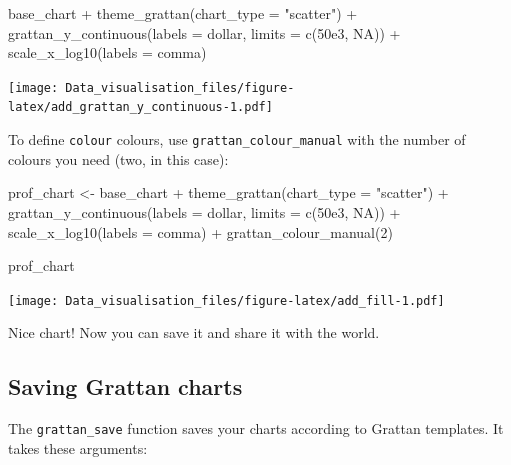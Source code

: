 \documentclass[
]{book}
\newenvironment{Shaded}{\begin{snugshade}}{\end{snugshade}}
\newcommand{\AttributeTok}[1]{\textcolor[rgb]{0.77,0.63,0.00}{#1}}
\newcommand{\ConstantTok}[1]{\textcolor[rgb]{0.00,0.00,0.00}{#1}}
\newcommand{\DecValTok}[1]{\textcolor[rgb]{0.00,0.00,0.81}{#1}}
\newcommand{\FloatTok}[1]{\textcolor[rgb]{0.00,0.00,0.81}{#1}}
\newcommand{\FunctionTok}[1]{\textcolor[rgb]{0.00,0.00,0.00}{#1}}
\newcommand{\NormalTok}[1]{#1}
\newcommand{\OtherTok}[1]{\textcolor[rgb]{0.56,0.35,0.01}{#1}}
\newcommand{\SpecialCharTok}[1]{\textcolor[rgb]{0.00,0.00,0.00}{#1}}
\newcommand{\StringTok}[1]{\textcolor[rgb]{0.31,0.60,0.02}{#1}}
\begin{document}
\begin{Shaded}
\begin{Highlighting}[]
\NormalTok{base\_chart }\SpecialCharTok{+}
        \FunctionTok{theme\_grattan}\NormalTok{(}\AttributeTok{chart\_type =} \StringTok{"scatter"}\NormalTok{) }\SpecialCharTok{+}
        \FunctionTok{grattan\_y\_continuous}\NormalTok{(}\AttributeTok{labels =}\NormalTok{ dollar, }\AttributeTok{limits =} \FunctionTok{c}\NormalTok{(}\FloatTok{50e3}\NormalTok{, }\ConstantTok{NA}\NormalTok{)) }\SpecialCharTok{+}
        \FunctionTok{scale\_x\_log10}\NormalTok{(}\AttributeTok{labels =}\NormalTok{ comma) }
\end{Highlighting}
\end{Shaded}

\texttt{[image: Data\_visualisation\_files/figure-latex/add\_grattan\_y\_continuous-1.pdf]}

To define \texttt{colour} colours, use \texttt{grattan\_colour\_manual} with the number of colours you need (two, in this case):

\begin{Shaded}
\begin{Highlighting}[]
\NormalTok{prof\_chart }\OtherTok{\textless{}{-}}\NormalTok{ base\_chart }\SpecialCharTok{+}
        \FunctionTok{theme\_grattan}\NormalTok{(}\AttributeTok{chart\_type =} \StringTok{"scatter"}\NormalTok{) }\SpecialCharTok{+}
        \FunctionTok{grattan\_y\_continuous}\NormalTok{(}\AttributeTok{labels =}\NormalTok{ dollar, }\AttributeTok{limits =} \FunctionTok{c}\NormalTok{(}\FloatTok{50e3}\NormalTok{, }\ConstantTok{NA}\NormalTok{)) }\SpecialCharTok{+}
        \FunctionTok{scale\_x\_log10}\NormalTok{(}\AttributeTok{labels =}\NormalTok{ comma) }\SpecialCharTok{+}
        \FunctionTok{grattan\_colour\_manual}\NormalTok{(}\DecValTok{2}\NormalTok{) }

\NormalTok{prof\_chart}
\end{Highlighting}
\end{Shaded}

\texttt{[image: Data\_visualisation\_files/figure-latex/add\_fill-1.pdf]}

Nice chart! Now you can save it and share it with the world.

\hypertarget{saving-grattan-charts}{%
\subsection{Saving Grattan charts}\label{saving-grattan-charts}}

The \texttt{grattan\_save} function saves your charts according to Grattan templates. It takes these arguments:
\end{document}
